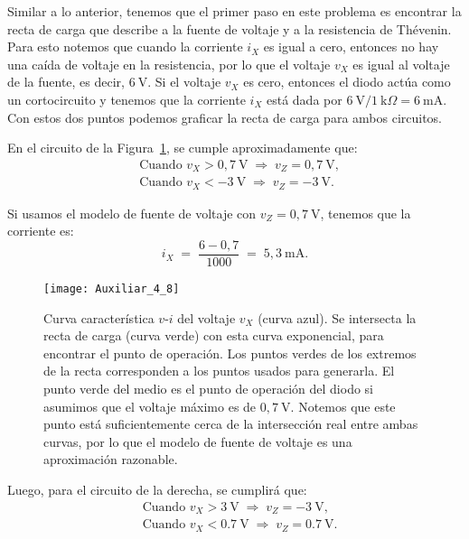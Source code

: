 \documentclass[
  11pt,
  letterpaper,
   addpoints,
  ]{exam}
\begin{document}
\begin{questions}
\begin{solution}

Similar a lo anterior, tenemos que el primer paso en este problema es encontrar la recta de carga que describe a la fuente de voltaje y a la resistencia de Thévenin. Para esto notemos que cuando la corriente \(i_X\) es igual a cero, entonces no hay una caída de voltaje en la resistencia, por lo que el voltaje \(v_X\) es igual al voltaje de la fuente, es decir, \(6~\text{V}\). Si el voltaje \(v_X\) es cero, entonces el diodo actúa como un cortocircuito y tenemos que la corriente \(i_X\) está dada por \(6~\text{V}/1~\text{k}\Omega = 6~\text{mA}\). Con estos dos puntos podemos graficar la recta de carga para ambos circuitos.

\medskip
En el circuito de la Figura~\ref{fig:carac-v-i}, se cumple aproximadamente que:
\begin{align*}
&\text{Cuando } v_X > 0{,}7~\text{V} \;\Rightarrow\; v_Z = 0{,}7~\text{V},\\
&\text{Cuando } v_X < -3~\text{V} \;\Rightarrow\; v_Z = -3~\text{V}.
\end{align*}

Si usamos el modelo de fuente de voltaje con \(v_Z = 0{,}7~\text{V}\), tenemos que la corriente es:
\[
i_X \;=\; \frac{6 - 0{,}7}{1000} \;=\; 5{,}3~\text{mA}.
\]

\begin{figure}[H]
  \centering
  \texttt{[image: Auxiliar\_4\_8]}
  \caption{Curva característica \(v\)-\(i\) del voltaje \(v_X\) (curva azul). 
  Se intersecta la recta de carga (curva verde) con esta curva exponencial, para encontrar el punto de operación. 
  Los puntos verdes de los extremos de la recta corresponden a los puntos usados para generarla. 
  El punto verde del medio es el punto de operación del diodo si asumimos que el voltaje máximo es de \(0{,}7~\text{V}\). 
  Notemos que este punto está suficientemente cerca de la intersección real entre ambas curvas, por lo que el modelo de fuente de voltaje es una aproximación razonable.}
  \label{fig:carac-v-i}
\end{figure}


Luego, para el circuito de la derecha, se cumplirá que:
\begin{align*}
&\text{Cuando } v_X > 3~\text{V} \;\Rightarrow\; v_Z = -3~\text{V},\\
&\text{Cuando } v_X < 0.7~\text{V} \;\Rightarrow\; v_Z = 0.7~\text{V}.
\end{align*}


\end{solution}
\end{questions}
\end{document}
